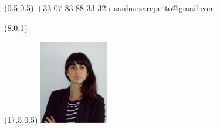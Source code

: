 \documentclass{tccv}
\begin{document}


\begin{textblock}{6.5}(0.5,0.5)
    {+33 07 83 88 33 32}
    {r.sanhuezarepetto@gmail.com}
\end{textblock}

\begin{textblock}{10}(8.0,1)
         
\end{textblock}

\begin{textblock}{21}(17.5,0.5)
		\includegraphics[width=3cm]{../Figure/Rocio3.png}
\end{textblock}  
\end{document}
